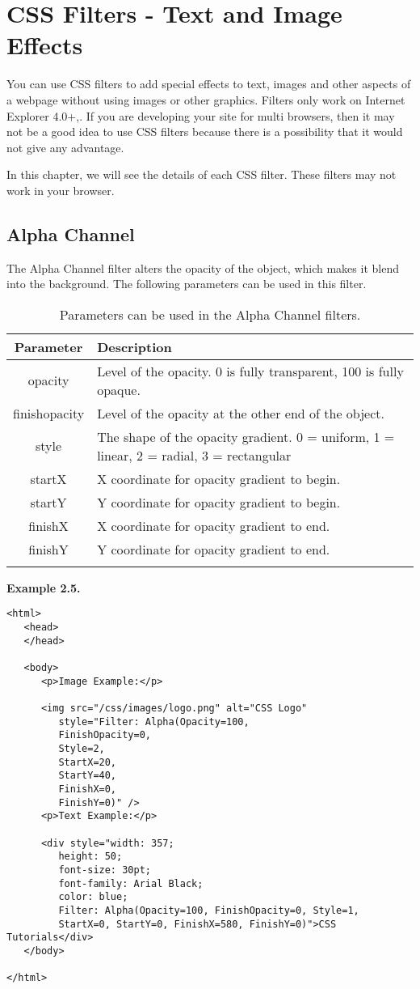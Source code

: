 \documentclass[a4paper,oneside]{book}
\numberwithin{equation}{chapter}
\begin{document}
\section{CSS Filters - Text and Image Effects}
You can use CSS filters to add special effects to text, images and other aspects of a webpage without using images or other graphics. Filters only work on Internet Explorer 4.0+,. If you are developing your site for multi browsers, then it may not be a good idea to use CSS filters because there is a possibility that it would not give any advantage.

In this chapter, we will see the details of each CSS filter. These filters may not work in your browser.
\subsection{Alpha Channel}
The Alpha Channel filter alters the opacity of the object, which makes it blend into the background. The following parameters can be used in this filter.
\begin{center}
\begin{longtable}{|c|p{9cm}|}
\hline
\textbf{Parameter} & \textbf{Description}\\
\hline
opacity & Level of the opacity. 0 is fully transparent, 100 is fully opaque.\\
\hline
finishopacity & Level of the opacity at the other end of the object.\\
\hline
style & The shape of the opacity gradient. 0 = uniform, 1 = linear, 2 = radial, 3 = rectangular\\
\hline
startX & X coordinate for opacity gradient to begin.\\
\hline
startY & Y coordinate for opacity gradient to begin.\\
\hline
finishX & X coordinate for opacity gradient to end.\\
\hline
finishY & Y coordinate for opacity gradient to end.\\
\hline
\caption{Parameters can be used in the Alpha Channel filters.}
\end{longtable}
\end{center}
\textbf{Example 2.5.} 
\begin{verbatim}
<html>
   <head>
   </head>
   
   <body>
      <p>Image Example:</p>
      
      <img src="/css/images/logo.png" alt="CSS Logo" 
         style="Filter: Alpha(Opacity=100, 
         FinishOpacity=0, 
         Style=2, 
         StartX=20, 
         StartY=40, 
         FinishX=0, 
         FinishY=0)" />
      <p>Text Example:</p>
      
      <div style="width: 357; 
         height: 50; 
         font-size: 30pt; 
         font-family: Arial Black; 
         color: blue;
         Filter: Alpha(Opacity=100, FinishOpacity=0, Style=1, 
         StartX=0, StartY=0, FinishX=580, FinishY=0)">CSS Tutorials</div>
   </body>
   
</html> 
\end{verbatim}
\end{document}
